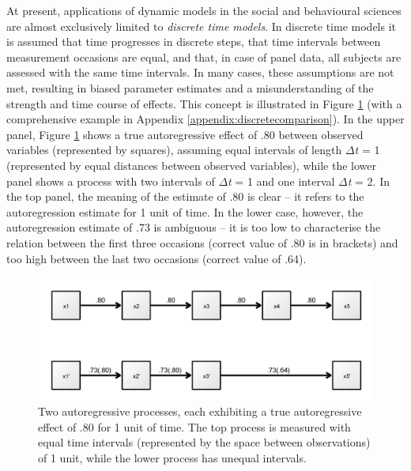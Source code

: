 \documentclass[nojss]{jss}\usepackage[]{graphicx}\usepackage[]{color}
\begin{document}
At present, applications of dynamic models in the social and behavioural sciences are almost exclusively limited to \textit{discrete time models}. In discrete time models it is assumed that time progresses in discrete steps, that time intervals between measurement occasions are equal, and that, in case of panel data, all subjects are assessed with the same time intervals. In many cases, these assumptions are not met, resulting in biased parameter estimates and a misunderstanding of the strength and time course of effects. This concept is illustrated in Figure \ref{fig:discretecomparison} (with a comprehensive example in Appendix \ref{appendix:discretecomparison}). In the upper panel, Figure \ref{fig:discretecomparison} shows a true autoregressive effect of .80 between observed variables (represented by squares), assuming equal intervals of length $\Delta$\textit{t} = 1 (represented by equal distances between observed variables), while the lower panel shows a process with two intervals of $\Delta$\textit{t} = 1 and one interval $\Delta$\textit{t} = 2. In the top panel, the meaning of the estimate of .80 is clear -- it refers to the autoregression estimate for 1 unit of time. In the lower case, however, the autoregression estimate of .73 is ambiguous -- it is too low to characterise the relation between the first three occasions (correct value of .80 is in brackets) and too high between the last two occasions (correct value of .64). 

\begin{figure}[!h]
\centering
\includegraphics[]{pathdiagramdiscretecomparison}
\caption{ \label{fig:discretecomparison} Two autoregressive processes, each exhibiting a true autoregressive effect of .80 for 1 unit of time. The top process is measured with equal time intervals (represented by the space between observations) of 1 unit, while the lower process has unequal intervals.}
\end{figure}
\end{document}
